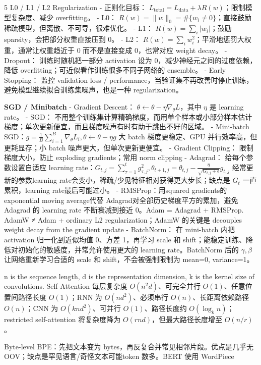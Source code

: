 \documentclass[a4paper, landscape]{article}
\begin{document}
\begin{multicols}{5}
L0 / L1 / L2 Regularization
- 正则化目标： \(L_{\text{total}}=L_{\text{data}}+\lambda R(w)\)；限制模型复杂度、减少 overfitting。
- L0： \(R(w)=\|w\|_0=\#\{w_i\neq0\}\)；直接鼓励稀疏模型，但离散、不可导，很难优化。
- L1： \(R(w)=\sum_i|w_i|\)；鼓励 sparsity，会把部分权重直接压到 0。
- L2： \(R(w)=\sum_iw_i^2\)；平滑地惩罚大权重，通常让权重趋近于 0 而不是直接变成 0，也常对应 weight decay。
- Dropout： 训练时随机把一部分 activation 设为 0，减少神经元之间的过度依赖，降低 overfitting；可近似看作训练很多不同子网络的 ensemble。
- Early Stopping： 监控 validation loss / performance，当验证集不再改善时停止训练，避免模型继续拟合训练集噪声，也是一种 regularization。
\par \textbf{SGD / Minibatch}
- Gradient Descent： \(\theta\leftarrow\theta-\eta\nabla_\theta L\)，其中 \(\eta\) 是 learning rate。
- SGD： 不用整个训练集计算精确梯度，而用单个样本或小部分样本估计梯度；单次更新便宜，而且梯度噪声有时有助于跳出不好的区域。
- Mini-batch SGD：\(
  g=\frac1B\sum_{i=1}^B\nabla_\theta L_i,
  \theta\leftarrow\theta-\eta g
  \)
  大 batch 梯度更稳定、GPU 并行效率高，但更耗显存；小 batch 噪声更大，但单次更新更便宜。
- Gradient Clipping： 限制梯度大小，防止 exploding gradients；常用 norm clipping 
- Adagrad： 给每个参数设置自适应 learning rate：\(
  G_{t,j}=\sum_{\tau=1}^{t}g_{\tau,j}^2,
  \theta_{t+1,j}
  =
  \theta_{t,j}
  -
  \frac{\eta}{\sqrt{G_{t,j}+\epsilon}}g_{t,j}
  \)
  经常更新的参数learning rate会变小，稀疏/少见特征相对获得更大步长；缺点是 \(G_t\) 一直累积，learning rate最后可能过小。
- RMSProp：用squared gradients的exponential moving average代替 Adagrad对全部历史梯度平方的累加，避免 Adagrad 的 learning rate 不断衰减到接近 0。Adam = Adagrad + RMSProp. AdamW ≠ Adam + ordinary L2 regularization；AdamW 的关键是 decouples weight decay from the gradient update
- BatchNorm： 在 mini-batch 内把 activation 归一化到近似均值 0、方差 1，再学习 scale 和 shift；能稳定训练、降低对初始化的敏感度，并常允许使用更大的 learning rate。BatchNorm 后的 \(\gamma,\beta\) 让网络重新学习合适的 scale 和 shift，不会被强制限制为 mean=0, variance=1。
\par n is the sequence length, d is the representation dimension, k is the kernel size of convolutions. Self-Attention 每层复杂度 \(O(n^2d)\)、可完全并行 \(O(1)\)、任意位置间路径长度 \(O(1)\)；RNN 为 \(O(nd^2)\)、必须串行 \(O(n)\)、长距离依赖路径 \(O(n)\)；CNN 为 \(O(knd^2)\)、可并行 \(O(1)\)、路径长度约 \(O(\log_k n)\)；restricted self-attention 将复杂度降为 \(O(rnd)\)，但最大路径长度增至 \(O(n/r)\)。
\par Byte-level BPE：先把文本变为 bytes，再反复合并常见相邻片段。优点是几乎无 OOV；缺点是罕见语言/奇怪文本可能token 数多。BERT 使用 WordPiece

\end{multicols}
\end{document}
